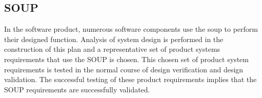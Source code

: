 \subsection{SOUP}
In the software product, numerous software components use the \gls{soup} to perform
their designed function.  Analysis of system design is performed in the
construction of this plan and a representative set of product systems
requirements that use the SOUP is chosen.  This chosen set of product
system requirements is tested in the normal course of design verification and
design validation.  The successful testing of these product requirements implies
that the SOUP requirements are successfully validated.

